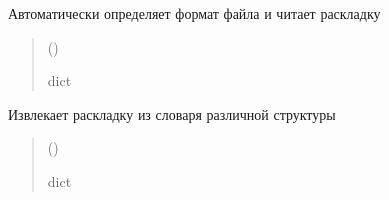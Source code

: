 \documentclass[a4paper,11pt,russian,openany,oneside]{sphinxmanual}
\begin{document}

\begin{savenotes}\begin{fulllineitems}
\label{\detokenize{_autosummary/scan_module.read_layout:scan_module.read_layout._auto_detect_and_read}}
\pysigstartsignatures
\pysiglinewithargsret
{}
{}
{}
\pysigstopsignatures
\sphinxAtStartPar
Автоматически определяет формат файла и читает раскладку
\begin{quote}\begin{description}
\sphinxAtStartPar
{} ()

\sphinxAtStartPar
dict

\end{description}\end{quote}

\end{fulllineitems}\end{savenotes}


\begin{savenotes}\begin{fulllineitems}
\label{\detokenize{_autosummary/scan_module.read_layout:scan_module.read_layout._extract_layout_from_dict}}
\pysigstartsignatures
\pysiglinewithargsret
{}
{}
{}
\pysigstopsignatures
\sphinxAtStartPar
Извлекает раскладку из словаря различной структуры
\begin{quote}\begin{description}
\sphinxAtStartPar
{} ()

\sphinxAtStartPar
dict

\end{description}\end{quote}

\end{fulllineitems}\end{savenotes}
\end{document}
